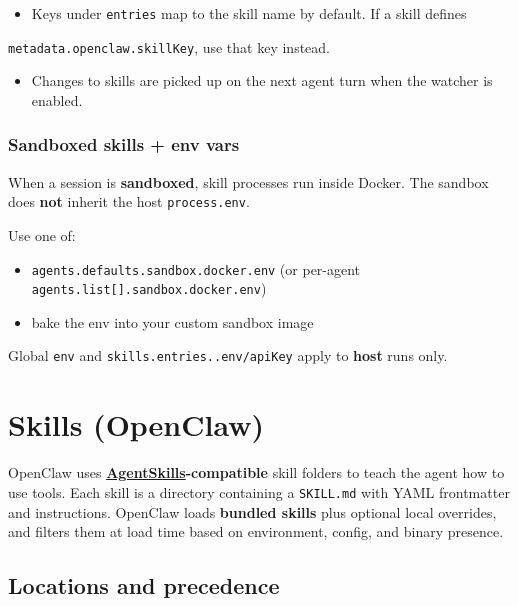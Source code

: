 \begin{itemize}
  \item Keys under \texttt{entries} map to the skill name by default. If a skill defines
\end{itemize}

\texttt{metadata.openclaw.skillKey}, use that key instead.
\begin{itemize}
  \item Changes to skills are picked up on the next agent turn when the watcher is enabled.
\end{itemize}


\subsubsection{Sandboxed skills + env vars}


When a session is \textbf{sandboxed}, skill processes run inside Docker. The sandbox
does \textbf{not} inherit the host \texttt{process.env}.

Use one of:

\begin{itemize}
  \item \texttt{agents.defaults.sandbox.docker.env} (or per-agent \texttt{agents.list[].sandbox.docker.env})
  \item bake the env into your custom sandbox image
\end{itemize}


Global \texttt{env} and \texttt{skills.entries..env/apiKey} apply to \textbf{host} runs only.


\clearpage

\section{Skills (OpenClaw)}


OpenClaw uses \textbf{\href{https://agentskills.io}{AgentSkills}-compatible} skill folders to teach the agent how to use tools. Each skill is a directory containing a \texttt{SKILL.md} with YAML frontmatter and instructions. OpenClaw loads \textbf{bundled skills} plus optional local overrides, and filters them at load time based on environment, config, and binary presence.

\subsection{Locations and precedence}


